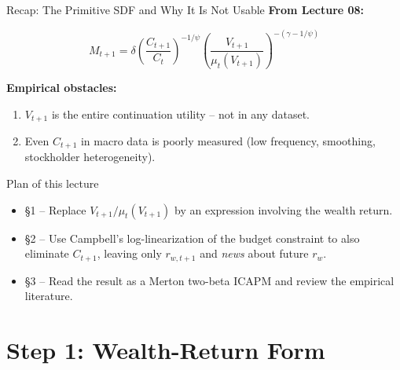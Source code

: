 \documentclass{beamer}
\begin{document}
\begin{frame}[shrink=8]{Recap: The Primitive SDF and Why It Is Not Usable}
	\textbf{From Lecture 08:}
	\begin{tcolorbox}[colback=blue!5!white, colframe=blue!75!black, title=Primitive Epstein-Zin SDF]
	\begin{equation*}
		M_{t+1} = \delta \left( \frac{C_{t+1}}{C_t} \right)^{-1/\psi} \left( \frac{V_{t+1}}{\mu_t(V_{t+1})} \right)^{-(\gamma-1/\psi)}
	\end{equation*}
	\end{tcolorbox}
	\textbf{Empirical obstacles:}
	\begin{enumerate}
		\item $V_{t+1}$ is the entire continuation utility -- not in any dataset.
		\item Even $C_{t+1}$ in macro data is poorly measured (low frequency, smoothing, stockholder heterogeneity).
	\end{enumerate}
	\vspace{2pt}
	\begin{block}{Plan of this lecture}
		\begin{itemize}
			\item \S 1 -- Replace $V_{t+1}/\mu_t(V_{t+1})$ by an expression involving the wealth return.
			\item \S 2 -- Use Campbell's log-linearization of the budget constraint to also eliminate $C_{t+1}$, leaving only $r_{w,t+1}$ and \textit{news} about future $r_{w}$.
			\item \S 3 -- Read the result as a Merton two-beta ICAPM and review the empirical literature.
		\end{itemize}
	\end{block}
\end{frame}

\section{Step 1: Wealth-Return Form}
\end{document}
